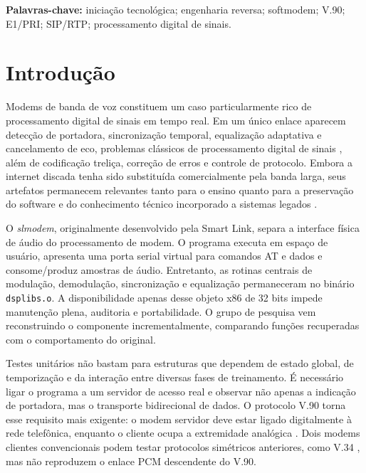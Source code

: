 \documentclass[12pt,a4paper]{article}
\newcommand{\slmodem}{\textit{slmodem}}
\newcommand{\dsplibs}{\texttt{dsplibs.o}}
\begin{document}
\noindent\textbf{Palavras-chave:} iniciação tecnológica; engenharia reversa;
softmodem; V.90; E1/PRI; SIP/RTP; processamento digital de sinais.

\clearpage
\tableofcontents
\clearpage
\listoffigures
\clearpage
\listoftables
\clearpage


\section{Introdução}

Modems de banda de voz constituem um caso particularmente rico de processamento
digital de sinais em tempo real. Em um único enlace aparecem detecção de portadora,
sincronização temporal, equalização adaptativa e cancelamento de eco, problemas
clássicos de processamento digital de sinais \cite{oppenheim2010}, além de codificação
treliça, correção de erros e controle de protocolo. Embora a internet discada tenha
sido substituída comercialmente pela banda larga, seus artefatos permanecem
relevantes tanto para o ensino quanto para a preservação do software e do
conhecimento técnico incorporado a sistemas legados
\cite{dicosmo2017,moshenska2016}.

O \slmodem, originalmente desenvolvido pela Smart Link, separa a interface física
de áudio do processamento de modem. O programa executa em espaço de usuário,
apresenta uma porta serial virtual para comandos AT e dados e consome/produz
amostras de áudio. Entretanto, as rotinas centrais de modulação, demodulação,
sincronização e equalização permaneceram no binário \dsplibs. A disponibilidade
apenas desse objeto x86 de 32 bits impede manutenção plena, auditoria e
portabilidade. O grupo de pesquisa vem reconstruindo o componente incrementalmente,
comparando funções recuperadas com o comportamento do original.

Testes unitários não bastam para estruturas que dependem de estado global, de
temporização e da interação entre diversas fases de treinamento. É necessário
ligar o programa a um servidor de acesso real e observar não apenas a indicação de
portadora, mas o transporte bidirecional de dados. O protocolo V.90 torna esse
requisito mais exigente: o modem servidor deve estar ligado digitalmente à rede
telefônica, enquanto o cliente ocupa a extremidade analógica
\cite{itutv90}. Dois modems clientes convencionais podem testar protocolos
simétricos anteriores, como V.34 \cite{itutv34}, mas não reproduzem o enlace PCM
descendente do V.90.
\end{document}

